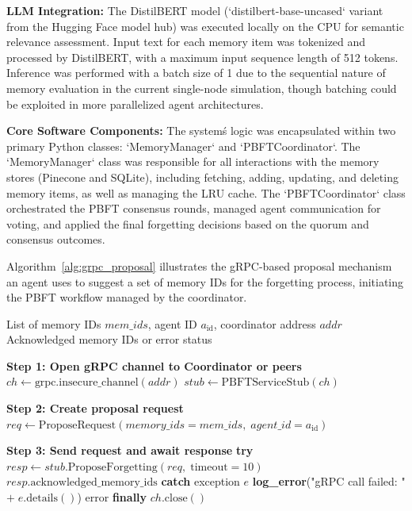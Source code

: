 \documentclass[conference]{IEEEtran}
\begin{document}
\textbf{LLM Integration:} The DistilBERT model (`distilbert-base-uncased` variant from the Hugging Face model hub) was executed locally on the CPU for semantic relevance assessment. Input text for each memory item was tokenized and processed by DistilBERT, with a maximum input sequence length of 512 tokens. Inference was performed with a batch size of 1 due to the sequential nature of memory evaluation in the current single-node simulation, though batching could be exploited in more parallelized agent architectures.

\textbf{Core Software Components:} The system\'s logic was encapsulated within two primary Python classes: `MemoryManager` and `PBFTCoordinator`. The `MemoryManager` class was responsible for all interactions with the memory stores (Pinecone and SQLite), including fetching, adding, updating, and deleting memory items, as well as managing the LRU cache. The `PBFTCoordinator` class orchestrated the PBFT consensus rounds, managed agent communication for voting, and applied the final forgetting decisions based on the quorum and consensus outcomes.

Algorithm~\ref{alg:grpc_proposal} illustrates the gRPC-based proposal mechanism an agent uses to suggest a set of memory IDs for the forgetting process, initiating the PBFT workflow managed by the coordinator.

\begin{algorithm}[H]
\caption{gRPC-Based PBFT Proposal (Agent Side)}
\label{alg:grpc_proposal}
\begin{algorithmic}[1]
\Require List of memory IDs $\mathit{mem\_ids}$, agent ID $a_{\text{id}}$, coordinator address $\mathit{addr}$
\Ensure Acknowledged memory IDs or error status

\Statex \textbf{Step 1: Open gRPC channel to Coordinator or peers}
\State $\mathit{ch} \gets \text{grpc.insecure\_channel}(\mathit{addr})$
\State $\mathit{stub} \gets \text{PBFTServiceStub}(\mathit{ch})$

\Statex \textbf{Step 2: Create proposal request}
\State $\mathit{req} \gets \text{ProposeRequest}(\mathit{memory\_ids}=\mathit{mem\_ids},\; \mathit{agent\_id}=a_{\text{id}})$

\Statex \textbf{Step 3: Send request and await response}
\State \textbf{try}
  \State \hspace{1em} $\mathit{resp} \gets \mathit{stub}.\text{ProposeForgetting}(\mathit{req},\;\text{timeout}=10)$
  \State \hspace{1em} \Return $\mathit{resp}.\text{acknowledged\_memory\_ids}$
\State \textbf{catch} exception $e$
  \State \hspace{1em} \textbf{log\_error}("gRPC call failed: " $\mathbin{+\;} e.\text{details}()$)
  \State \hspace{1em} \Return \textsf{error}
\State \textbf{finally}
  \State \hspace{1em} $\mathit{ch}.\text{close}()$
\end{algorithmic}
\end{algorithm}
\end{document}
